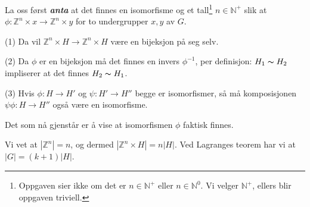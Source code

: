 \documentclass[a4paper,norsk,twocolumn,10pt]{article}
\begin{document}
La oss først \textbf{\textit{anta}} at det finnes en isomorfisme og et
tall\footnote{Oppgaven sier ikke om det er $n \in \mathbb{N}^+$ eller $n \in
\mathbb{N}^0$. Vi velger $\mathbb{N}^+$, ellers blir oppgaven triviell.} $n \in
\mathbb{N}^+$ slik at $\phi\colon \mathbb{Z}^n \times x \rightarrow
\mathbb{Z}^n \times y$ for to undergrupper $x,y$ av $G$.

(1) Da vil $\mathbb{Z}^n \times H \rightarrow \mathbb{Z}^n \times H$ være en
bijeksjon på seg selv.

(2) Da $\phi$ er en bijeksjon må det finnes en invers $\phi^{-1}$, per
definisjon: $H_1 \thicksim H_2$ impliserer at det finnes $H_2 \thicksim H_1$.

(3) Hvis $\phi\colon H \rightarrow H'$ og $\psi\colon H' \rightarrow H''$ begge
er isomorfismer, så må komposisjonen $\psi\phi\colon H \rightarrow H''$ også
være en isomorfisme.

Det som nå gjenstår er å vise at isomorfismen $\phi$ faktisk finnes.

Vi vet at $|\mathbb{Z}^n|=n$, og dermed $|\mathbb{Z}^n \times H| = n|H|$. Ved
Lagranges teorem har vi at $|G|=(k+1)|H|$.
\end{document}
